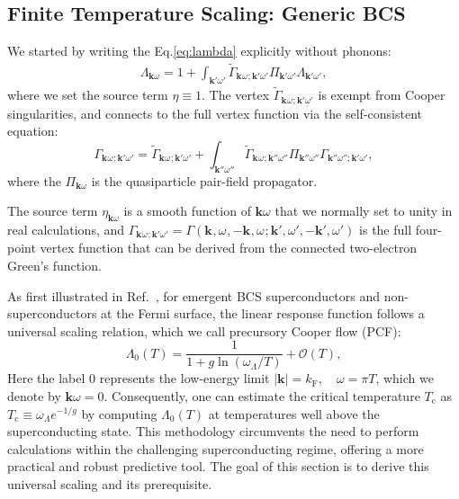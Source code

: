 \documentclass[%
 reprint,
superscriptaddress,
 amsmath,amssymb,
 aps,
prx,
]{revtex4-2}
\newcommand{\bk}{\mathbf{k}}
\newcommand{\Gammapp}{\tilde{\Gamma}}
\newcommand{\txc}{\text{c}}
\newcommand{\txF}{\text{F}}
\newcommand{\pcf}{\Lambda} %
\begin{document}
\begin{appendices}
\section{Finite Temperature Scaling: Generic BCS }
\label{app:pcf}

We started by writing the Eq.\eqref{eq:lambda} explicitly without phonons:
\begin{eqnarray}
  \label{eq:LR}
  \pcf_{\bk\omega}=1+\int _{\bk'\omega'} \Gammapp_{\bk^{}\omega^{};\bk'\omega'} \Pi_{\bk'\omega'} \pcf_{\bk'\omega'},
\end{eqnarray}
where we set the source term $\eta\equiv1$.
The vertex $\tilde{\Gamma}_{\bk^{}\omega^{};\bk'\omega'}$ is exempt from Cooper singularities, and connects to the full vertex function via the self-consistent equation:
\begin{equation}
\Gamma_{\bk^{}\omega^{};\bk'\omega'} = \tilde{\Gamma}_{\bk^{}\omega^{};\bk'\omega'} + \int_{\bk''\omega''} \tilde{\Gamma}_{\bk^{}\omega^{};\bk''\omega''}\Pi_{\bk''\omega''}\Gamma_{\bk''\omega'';\bk'\omega'},
\end{equation}
where the $\Pi_{\bk\omega}$ is the quasiparticle pair-field propagator. 

The source term $\eta_{\bk\omega}$ is a smooth function of $\bk\omega$ that we normally set to unity in real calculations, and $\Gamma_{\bk^{}\omega^{};\bk'\omega'}=\Gamma(\bk^{},\omega^{},-\bk^{} ,\omega^{};\bk',\omega',-\bk',\omega')$ is the
full four-point vertex function that can be derived from the connected
two-electron Green's function. 

As first illustrated in Ref.~\cite{pengcheng}, for emergent BCS superconductors and non-superconductors at the Fermi surface,
the linear response function follows a universal scaling relation, which we call
precursory Cooper flow (PCF): 
\begin{equation}
  \pcf_0(T)=\frac{1}{1+g \ln \left(\omega_\Lambda / T\right)}+\mathcal{O}(T),
  \label{eq:flow}
\end{equation}
Here the label $0$ represents the low-energy limit $|\bk|=k_\txF,\quad \omega = \pi T$, which we denote by $\bk\omega=0$.
Consequently, one can estimate the critical temperature $T_\txc$ as $T_\txc\equiv
\omega_\Lambda e^{-1/g}$ by computing $\pcf_0(T)$ at temperatures well above the
superconducting state. This methodology circumvents the need to perform
calculations within the challenging superconducting regime, offering a more
practical and robust predictive tool. The goal of this section is to 
derive this universal scaling and its prerequisite. 


\end{appendices}
\end{document}
